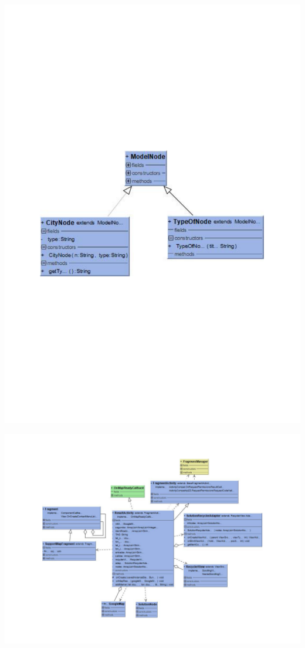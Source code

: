 \thispagestyle{empty}
{%
	\label{fig:models_diagram}
	\centering
	\includegraphics[scale=.95,angle=90]{imagenes/models_class_diagram.pdf}
	\par
}
\restoregeometry

\thispagestyle{empty}
{%
	\label{fig:result_activity_diagram}
	\centering
	\includegraphics[scale=.95,angle=90]{imagenes/result_activity_class_diagram.pdf}
	\par
}
\restoregeometry

